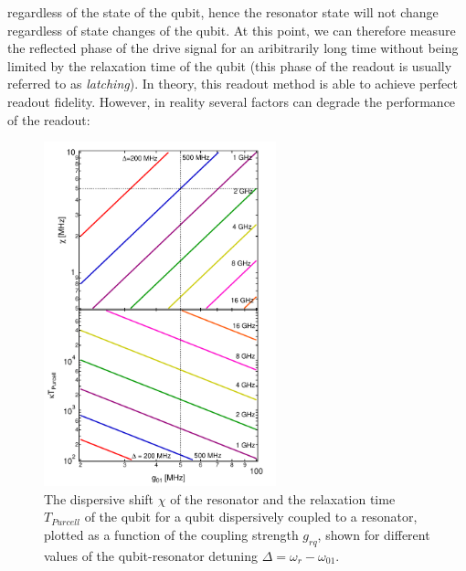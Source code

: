 regardless of the state of the qubit, hence the resonator state will not change regardless of state changes of the qubit. At this point, we can therefore measure the reflected phase of the drive signal for an aribitrarily long time without being limited by the relaxation time of the qubit (this phase of the readout is usually referred to as {\it latching}). In theory, this readout method is able to achieve perfect readout fidelity. However, in reality several factors can degrade the performance of the readout:

\begin{figure}
	\includegraphics[width=0.6\textwidth]{./material/mathematica/readout_purcell_and_chi_vs_g}
	\caption[]{The dispersive shift $\chi$ of the resonator and the relaxation time $T_{Purcell}$ of the qubit for a qubit dispersively coupled to a resonator, plotted as a function of the coupling strength $g_{rq}$, shown for different values of the qubit-resonator detuning $\Delta = \omega_{r}-\omega_{01}$.}
	\label{fig:purcell_rate_and_chi}
\end{figure}

